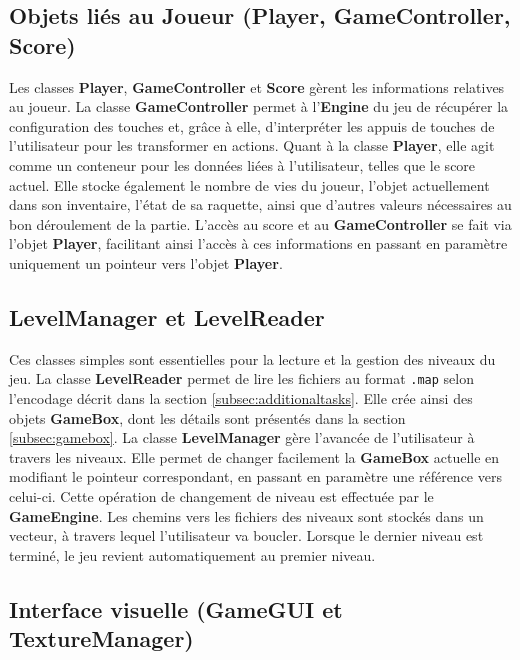 \documentclass{article}
\begin{document}
\subsection{Objets liés au Joueur (Player, GameController, Score)}

\noindent Les classes \textbf{Player}, \textbf{GameController} et \textbf{Score} gèrent les informations relatives au joueur. La classe \textbf{GameController} permet à l'\textbf{Engine} du jeu de récupérer la configuration des touches et, grâce à elle, d'interpréter les appuis de touches de l'utilisateur pour les transformer en actions. Quant à la classe \textbf{Player}, elle agit comme un conteneur pour les données liées à l'utilisateur, telles que le score actuel. Elle stocke également le nombre de vies du joueur, l'objet actuellement dans son inventaire, l'état de sa raquette, ainsi que d'autres valeurs nécessaires au bon déroulement de la partie. L'accès au score et au \textbf{GameController} se fait via l'objet \textbf{Player}, facilitant ainsi l'accès à ces informations en passant en paramètre uniquement un pointeur vers l'objet \textbf{Player}.

\subsection{LevelManager et LevelReader}

\noindent Ces classes simples sont essentielles pour la lecture et la gestion des niveaux du jeu. La classe \textbf{LevelReader} permet de lire les fichiers au format \texttt{.map} selon l'encodage décrit dans la section \ref{subsec:additionaltasks}. Elle crée ainsi des objets \textbf{GameBox}, dont les détails sont présentés dans la section \ref{subsec:gamebox}. La classe \textbf{LevelManager} gère l'avancée de l'utilisateur à travers les niveaux. Elle permet de changer facilement la \textbf{GameBox} actuelle en modifiant le pointeur correspondant, en passant en paramètre une référence vers celui-ci. Cette opération de changement de niveau est effectuée par le \textbf{GameEngine}. Les chemins vers les fichiers des niveaux sont stockés dans un vecteur, à travers lequel l'utilisateur va boucler. Lorsque le dernier niveau est terminé, le jeu revient automatiquement au premier niveau.

\subsection{Interface visuelle (GameGUI et TextureManager)}
\end{document}
